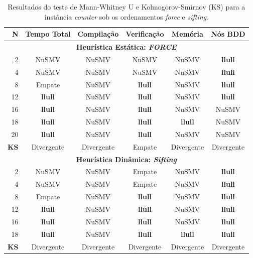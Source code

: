 \documentclass[cic,tc]{infufrgs}
\begin{document}
	\begin{table}[htbp]
		\centering
		\caption{Resultados do teste de Mann-Whitney U e Kolmogorov-Smirnov (KS) para a instância \textit{counter} sob os ordenamentos \textit{force} e \textit{sifting}.}
		\label{tab:estatistica_unificada_counter_heuristics}
		\small 
		\begin{tabular}{rccccc}
			\toprule
			\textbf{N} & \textbf{Tempo Total} & \textbf{Compilação} & \textbf{Verificação} & \textbf{Memória} & \textbf{Nós BDD} \\
			\midrule
			\multicolumn{6}{c}{\textbf{Heurística Estática: \textit{FORCE}}} \\
			\midrule
			2  & NuSMV          & NuSMV        & NuSMV          & NuSMV          & \textbf{llull} \\
			4  & NuSMV          & NuSMV        & NuSMV          & NuSMV          & \textbf{llull} \\
			8  & Empate         & NuSMV        & \textbf{llull} & NuSMV          & \textbf{llull} \\
			12 & \textbf{llull} & NuSMV        & \textbf{llull} & NuSMV          & \textbf{llull} \\
			16 & \textbf{llull} & NuSMV        & \textbf{llull} & NuSMV          & NuSMV          \\
			18 & \textbf{llull} & NuSMV        & \textbf{llull} & \textbf{llull} & NuSMV          \\
			20 & \textbf{llull} & NuSMV        & \textbf{llull} & NuSMV          & NuSMV          \\
			\midrule
			\textbf{KS} & Divergente & Divergente & Empate & Divergente & Divergente \\
			\midrule
			\multicolumn{6}{c}{\textbf{Heurística Dinâmica: \textit{Sifting}}} \\
			\midrule
			2  & NuSMV          & NuSMV        & Empate         & NuSMV          & \textbf{llull} \\
			4  & NuSMV          & NuSMV        & Empate         & NuSMV          & \textbf{llull} \\
			8  & Empate         & NuSMV        & \textbf{llull} & NuSMV          & \textbf{llull} \\
			12 & \textbf{llull} & NuSMV        & \textbf{llull} & NuSMV          & \textbf{llull} \\
			16 & \textbf{llull} & NuSMV        & \textbf{llull} & NuSMV          & \textbf{llull} \\
			18 & \textbf{llull} & NuSMV        & \textbf{llull} & \textbf{llull} & \textbf{llull} \\
			\midrule
			\textbf{KS} & Divergente & Divergente & Divergente & Divergente & Divergente \\
			\bottomrule
		\end{tabular}
	\end{table}
	
\end{document}
